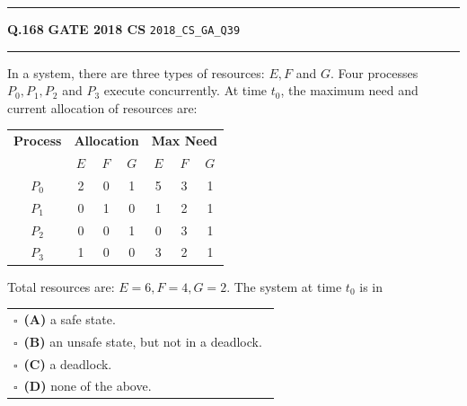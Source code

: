 \documentclass[a4paper,10pt]{article}
\begin{document}
\vspace{6pt}\hrule height 0.35pt\vspace{6pt}
\noindent
\begin{tcolorbox}[
    blanker,
    sidebyside,
    sidebyside align=top,
    lefthand width=0.55\textwidth,
    top=4pt, bottom=4pt, left=0pt, right=0pt,
    middle=16pt,
    underlay={
        \draw[dashed, black!80, line width=0.8pt, dash pattern=on 4pt off 3pt]
            ([xshift=0.55\textwidth+8pt]frame.north west) --
            ([xshift=0.55\textwidth+8pt]frame.south west);
    }
]
\textbf{Q.168}  \hfill {\footnotesize\textbf{GATE 2018 CS} \quad \tiny\texttt{2018\_CS\_GA\_Q39}}
\vspace{2pt}\hrule height 0.3pt\vspace{4pt}

In a system, there are three types of resources: $E, F$ and $G$. Four processes $P_0, P_1, P_2$ and $P_3$ execute concurrently. At time $t_0$, the maximum need and current allocation of resources are:
\begin{center}
\begin{tabular}{c|ccc|ccc}
\textbf{Process} & \multicolumn{3}{c|}{\textbf{Allocation}} & \multicolumn{3}{c}{\textbf{Max Need}} \\
& $E$ & $F$ & $G$ & $E$ & $F$ & $G$ \\
\hline
$P_0$ & 2 & 0 & 1 & 5 & 3 & 1 \\
$P_1$ & 0 & 1 & 0 & 1 & 2 & 1 \\
$P_2$ & 0 & 0 & 1 & 0 & 3 & 1 \\
$P_3$ & 1 & 0 & 0 & 3 & 2 & 1 \\
\end{tabular}
\end{center}
Total resources are: $E = 6, F = 4, G = 2$. The system at time $t_0$ is in

\par\vspace{6pt}\noindent
\begin{tabular}{@{}p{0.98\linewidth}@{}}
$\square$\ \textbf{(A)} a safe state. \\
\addlinespace[3pt]
$\square$\ \textbf{(B)} an unsafe state, but not in a deadlock. \\
\addlinespace[3pt]
$\square$\ \textbf{(C)} a deadlock. \\
\addlinespace[3pt]
$\square$\ \textbf{(D)} none of the above.
\end{tabular}


\end{tcolorbox}
\end{document}
